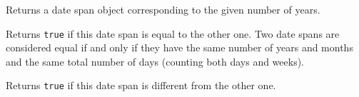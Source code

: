
Returns a date span object corresponding to the given number of years.



\label{wxdatespanoperatorequal}


Returns {\tt true} if this date span is equal to the other one. Two date spans
are considered equal if and only if they have the same number of years and
months and the same total number of days (counting both days and weeks).

\label{wxdatespanoperatornotequal}


Returns {\tt true} if this date span is different from the other one.



